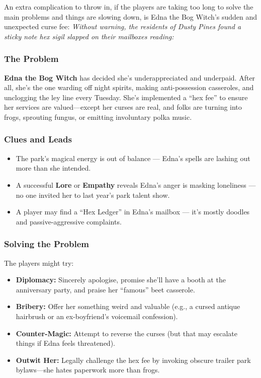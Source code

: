 An extra complication to throw in, if the players are taking too long to solve the main problems and things are slowing down, is Edna the Bog Witch’s sudden and unexpected curse fee: \emph{Without warning, the residents of Dusty Pines found a sticky note hex sigil slapped on their mailboxes reading:}
\begin{center}
\end{center}


\subsubsection{The Problem}
\textbf{Edna the Bog Witch} has decided she’s underappreciated and underpaid. After all, she’s the one warding off night spirits, making anti-possession casseroles, and unclogging the ley line every Tuesday. She’s implemented a “hex fee” to ensure her services are valued—except her curses are real, and folks are turning into frogs, sprouting fungus, or emitting involuntary polka music.

\subsubsection{Clues and Leads}
\begin{itemize}
    \item The park’s magical energy is out of balance — Edna’s spells are lashing out more than she intended.
    \item A successful \textbf{Lore} or \textbf{Empathy}  reveals Edna’s anger is masking loneliness — no one invited her to last year’s park talent show.
    \item A player may find a “Hex Ledger” in Edna’s mailbox — it's mostly doodles and passive-aggressive complaints.
\end{itemize}

\subsubsection{Solving the Problem}
The players might try:
\begin{itemize}
    \item \textbf{Diplomacy:} Sincerely apologise, promise she’ll have a booth at the anniversary party, and praise her “famous” beet casserole.
    \item \textbf{Bribery:} Offer her something weird and valuable (e.g., a cursed antique hairbrush or an ex-boyfriend's voicemail confession).
    \item \textbf{Counter-Magic:} Attempt to reverse the curses (but that may escalate things if Edna feels threatened).
    \item \textbf{Outwit Her:} Legally challenge the hex fee by invoking obscure trailer park bylaws—she hates paperwork more than frogs.
\end{itemize}

